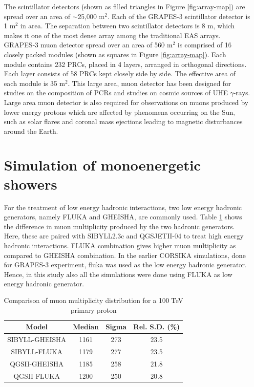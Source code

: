 \documentclass[12pt]{article}
\begin{document}
The scintillator detectors (shown as filled triangles in Figure
\ref{fig:array-map}) are spread over an area of $\sim$25,000 m$^2$. Each of the
GRAPES-3 scintillator detector is 1 m$^2$ in area. The separation between two
scintillator detectors is 8 m, which makes it one of the most dense array among
the traditional EAS arrays. GRAPES-3 muon detector spread over an area of 560
m$^2$ is comprised of 16 closely packed modules (shown as squares in Figure
\ref{fig:array-map}). Each module contains 232 PRCs, placed in 4 layers,
arranged in orthogonal directions. Each layer consists of 58 PRCs kept closely
side by side. The effective area of each module is 35 m$^2$. This large area,
muon detector has been designed for studies on the composition of PCRs and
studies on cosmic sources of UHE $\gamma$-rays. Large area muon detector is
also required for observations on muons produced by lower energy protons which
are affected by phenomena occurring on the Sun, such as solar flares and
coronal mass ejections leading to magnetic disturbances around the Earth.

\section{Simulation of monoenergetic showers}

For the treatment of low energy hadronic interactions, two low energy hadronic
generators, namely FLUKA and GHEISHA, are commonly used. Table
\ref{tab:fluka-gheisha} shows the difference in muon multiplicity produced by
the two hadronic generators. Here, these are paired with SIBYLL2.3c and
QGSJETII-04 to treat high energy hadronic interactions. FLUKA combination gives
higher muon multiplicity as compared to GHEISHA combination. In the earlier
CORSIKA simulations, done for GRAPES-3 experiment, fluka was used as the low
energy hadronic generator. Hence, in this study also all the simulations were
done using FLUKA as low energy hadronic generator. 

\begin{table}
\centering
\begin{tabular}{ | c | c | c | c |} 
\hline
Model & Median & Sigma & Rel. S.D. (\%) \\ 
\hline
SIBYLL-GHEISHA &1161 & 273 & 23.5  \\ 
\hline
SIBYLL-FLUKA   & 1179 & 277 & 23.5  \\
\hline
QGSII-GHEISHA  & 1185 & 258 & 21.8  \\
\hline
QGSII-FLUKA  & 1200 & 250 & 20.8 \\
\hline
\end{tabular}
\caption{Comparison of muon  multiplicity distribution for a 100 TeV primary proton}
\label{tab:fluka-gheisha}
\end{table}
\end{document}
